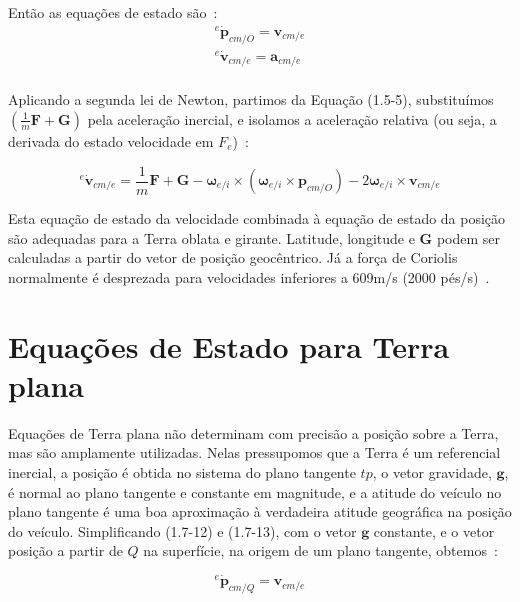Então as equações de estado são~\cite{Stevens2016}:
\begin{align*}\tag{1.7-12}
   {^{e}{\dot{\mathbf{p}}}_{cm/O}} = \mathbf{v}_{cm/e} \\
   {^{e}{\dot{\mathbf{v}}}_{cm/e}} = \mathbf{a}_{cm/e} \\
\end{align*}

Aplicando a segunda lei de Newton, partimos da Equação (1.5-5), substituímos \(\left( \textstyle{\frac{1}{m}}\mathbf{F} + \mathbf{G}\right)\) pela aceleração inercial, e isolamos a aceleração relativa (ou seja, a derivada do estado velocidade em \(F_{e}\))~\cite{Stevens2016}:

\begin{equation*}\tag{1.7-13}
   {^{e}{\dot{\mathbf{v}}_{cm/e}}} = \textstyle{\frac{1}{m}} \mathbf{F} + \mathbf{G} - \mathbf{\omega}_{e/i} \times \left( \mathbf{\omega}_{e/i} \times \mathbf{p}_{cm/O} \right) - 2 \mathbf{\omega}_{e/i} \times \mathbf{v}_{cm/e}
\end{equation*}

Esta equação de estado da velocidade combinada à equação de estado da posição são adequadas para a Terra oblata e girante. Latitude, longitude e \(\mathbf{G}\) podem ser calculadas a partir do vetor de posição geocêntrico. Já a força de Coriolis normalmente é desprezada para velocidades inferiores a 609m/s (2000 pés/s)~\cite{Stevens2016}.

\section{Equações de Estado para Terra plana}

Equações de Terra plana não determinam com precisão a posição sobre a Terra, mas são amplamente utilizadas. Nelas pressupomos que a Terra é um referencial inercial, a posição é obtida no sistema do plano tangente \(tp\), o vetor gravidade, \(\mathbf{g}\), é normal ao plano tangente e constante em magnitude, e a atitude do veículo no plano tangente é uma boa aproximação à verdadeira atitude geográfica na posição do veículo. Simplificando (1.7-12) e (1.7-13), com o vetor \(\mathbf{g}\) constante, e o vetor posição a partir de \(Q\) na superfície, na origem de um plano tangente, obtemos~\cite{Stevens2016}:

\begin{equation*}\tag{1.7-15}
   {^{e}{\dot{\mathbf{p}}_{cm/Q}}} = \mathbf{v}_{cm/e}
\end{equation*}

